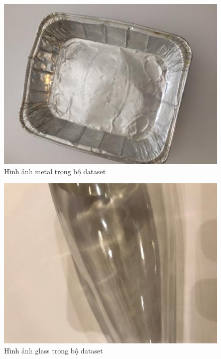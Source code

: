 \begin{figure}[H]
    \centering
    \includegraphics[width=\linewidth]{images/Quanh/metal5.jpg}
    \caption{Hình ảnh metal trong bộ dataset}
    \label{fig:metal}
\end{figure}

\begin{figure}[H]
    \centering
    \includegraphics[width=\linewidth]{images/Quanh/glass98.jpg}
    \caption{Hình ảnh glass trong bộ dataset}
    \label{fig:glass}
\end{figure}

